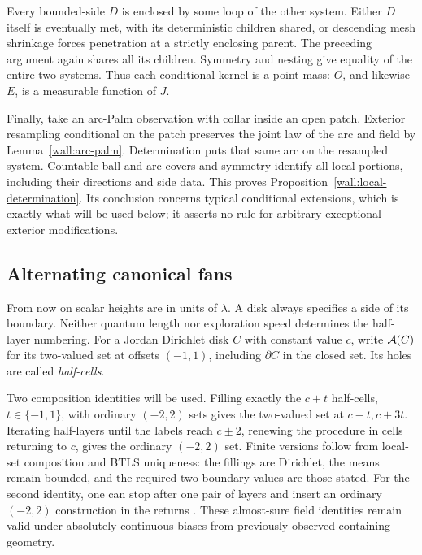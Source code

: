 Every bounded-side $D$ is enclosed by some loop of the other system.  Either $D$ itself is eventually met, with its deterministic children shared, or descending mesh shrinkage forces penetration at a strictly enclosing parent.  The preceding argument again shares all its children.  Symmetry and nesting give equality of the entire two systems.  Thus each conditional kernel is a point mass: $O$, and likewise $E$, is a measurable function of $J$.

Finally, take an arc-Palm observation with collar inside an open patch.  Exterior resampling conditional on the patch preserves the joint law of the arc and field by Lemma~\ref{wall:arc-palm}.  Determination puts that same arc on the resampled system.  Countable ball-and-arc covers and symmetry identify all local portions, including their directions and side data.  This proves Proposition~\ref{wall:local-determination}.  Its conclusion concerns typical conditional extensions, which is exactly what will be used below; it asserts no rule for arbitrary exceptional exterior modifications.
\subsection{Alternating canonical fans}

From now on scalar heights are in units of $\lambda$.  A disk always specifies a side of its boundary.  Neither quantum length nor exploration speed determines the half-layer numbering.  For a Jordan Dirichlet disk $C$ with constant value $c$, write $\mathcal A(C)$ for its two-valued set at offsets $(-1,1)$, including $\partial C$ in the closed set.  Its holes are called \emph{half-cells}.

Two composition identities will be used.  Filling exactly the $c+t$ half-cells, $t\in\{-1,1\}$, with ordinary $(-2,2)$ sets gives the two-valued set at $c-t,c+3t$.  Iterating half-layers until the labels reach $c\pm2$, renewing the procedure in cells returning to $c$, gives the ordinary $(-2,2)$ set.  Finite versions follow from local-set composition and BTLS uniqueness: the fillings are Dirichlet, the means remain bounded, and the required two boundary values are those stated.  For the second identity, one can stop after one pair of layers and insert an ordinary $(-2,2)$ construction in the returns \cite[Section~6.1 and Remark~19]{ASWlocal}.  These almost-sure field identities remain valid under absolutely continuous biases from previously observed containing geometry.


